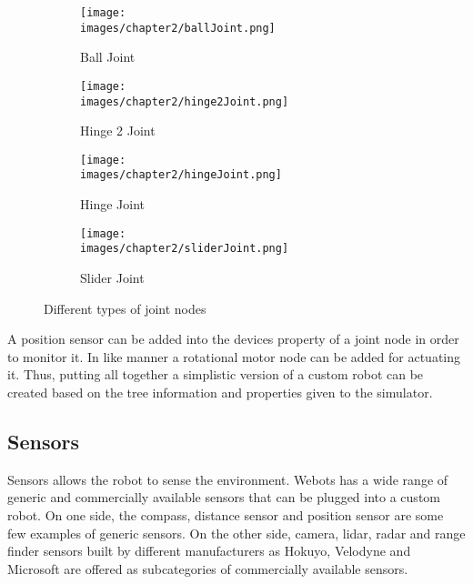 \begin{figure}[h!]
  \centering
  \begin{subfigure}[b]{0.47\linewidth}
  	\texttt{[image: \\images/chapter2/ballJoint.png]}
  	\caption{Ball Joint}
  	\label{fig:ch-2:ball-joint}
  \end{subfigure}
  \vspace{0.00mm}
  \begin{subfigure}[b]{0.47\linewidth}
  	\texttt{[image: \\images/chapter2/hinge2Joint.png]}
  	\caption{Hinge 2 Joint}
  	\label{fig:ch-2:highe-2-joint}
  \end{subfigure}
  \vspace{0.00mm}
  \begin{subfigure}[b]{0.47\linewidth}
  	\texttt{[image: \\images/chapter2/hingeJoint.png]}
  	\caption{Hinge Joint}
  	\label{fig:ch-2:hinge-joint}
  \end{subfigure}
  \vspace{0.00mm}
  \begin{subfigure}[b]{0.47\linewidth}
  	\texttt{[image: \\images/chapter2/sliderJoint.png]}
  	\caption{Slider Joint}
  	\label{fig:ch-2:slider-joint}
  \end{subfigure}
  \caption{Different types of joint nodes}
  \label{fig:ch-2:joints}
\end{figure}


A position sensor can be added into the devices property of a joint node in order to monitor it. In like manner a rotational motor node can be added for actuating it. Thus, putting all together a simplistic version of a custom robot can be created based on the tree information and properties given to the simulator.

\subsection{Sensors}\label{sec:ch-2:sensors}

Sensors allows the robot to sense the environment. Webots has a wide range of generic and commercially available sensors that can be plugged into a custom robot. On one side, the compass, distance sensor and position sensor are some few examples of generic sensors. On the other side, camera, lidar, radar and range finder sensors built by different manufacturers as Hokuyo, Velodyne and Microsoft are offered as subcategories of commercially available sensors. 

